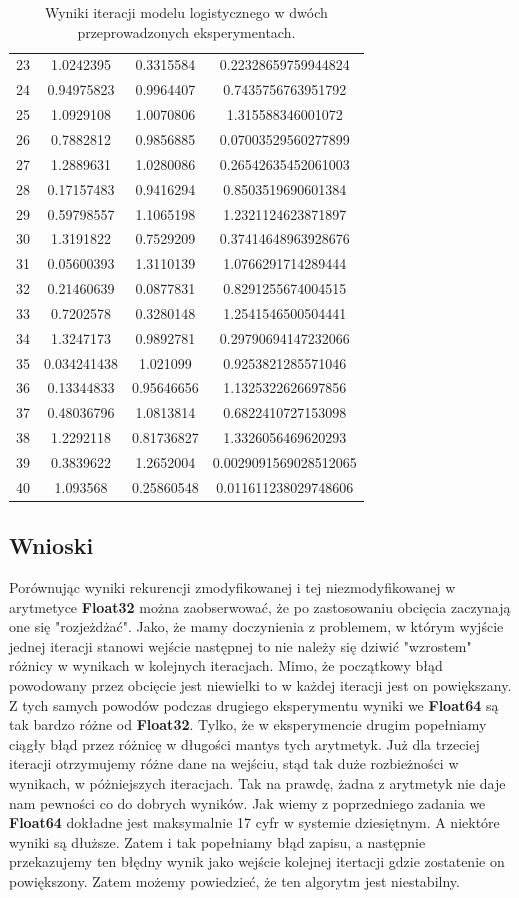 \documentclass[]{article}
\begin{document}
\begin{table}[h!]
\begin{tabular}{||c c c c||}
		23 & 1.0242395 & 0.3315584 & 0.22328659759944824 \\
		24 & 0.94975823 & 0.9964407 & 0.7435756763951792 \\
		25 & 1.0929108 & 1.0070806 & 1.315588346001072 \\
		26 & 0.7882812 & 0.9856885 & 0.07003529560277899 \\
		27 & 1.2889631 & 1.0280086 & 0.26542635452061003 \\
		28 & 0.17157483 & 0.9416294 & 0.8503519690601384 \\
		29 & 0.59798557 & 1.1065198 & 1.2321124623871897 \\
		30 & 1.3191822 & 0.7529209 & 0.37414648963928676 \\
		31 & 0.05600393 & 1.3110139 & 1.0766291714289444 \\
		32 & 0.21460639 & 0.0877831 & 0.8291255674004515 \\
		33 & 0.7202578 & 0.3280148 & 1.2541546500504441 \\
		34 & 1.3247173 & 0.9892781 & 0.29790694147232066 \\
		35 & 0.034241438 & 1.021099 & 0.9253821285571046 \\
		36 & 0.13344833 & 0.95646656 & 1.1325322626697856 \\
		37 & 0.48036796 & 1.0813814 & 0.6822410727153098 \\
		38 & 1.2292118 & 0.81736827 & 1.3326056469620293 \\
		39 & 0.3839622 & 1.2652004 & 0.0029091569028512065 \\
		40 & 1.093568 & 0.25860548 & 0.011611238029748606 \\
		\hline
	\end{tabular}
	\caption{Wyniki iteracji modelu logistycznego w dwóch przeprowadzonych eksperymentach.}
\end{table}
\subsection{Wnioski}
Porównując wyniki rekurencji zmodyfikowanej i tej niezmodyfikowanej w arytmetyce \textbf{Float32} można zaobserwować, że po zastosowaniu obcięcia zaczynają one się "rozjeżdżać". Jako, że mamy doczynienia z problemem, w którym wyjście jednej iteracji stanowi wejście następnej to nie należy się dziwić "wzrostem" różnicy w wynikach w kolejnych iteracjach. Mimo, że początkowy błąd powodowany przez obcięcie jest niewielki to w każdej iteracji jest on powiększany. Z tych samych powodów podczas drugiego eksperymentu wyniki we \textbf{Float64} są tak bardzo różne od \textbf{Float32}. Tylko, że w eksperymencie drugim popełniamy ciągły błąd przez różnicę w długości mantys tych arytmetyk. Już dla trzeciej iteracji otrzymujemy różne dane na wejściu, stąd tak duże rozbieżności w wynikach, w póżniejszych iteracjach. Tak na prawdę, żadna z arytmetyk nie daje nam pewności co do dobrych wyników. Jak wiemy z poprzedniego zadania we \textbf{Float64} dokładne jest maksymalnie 17 cyfr w systemie dziesiętnym. A niektóre wyniki są dłuższe. Zatem i tak popełniamy błąd zapisu, a następnie przekazujemy ten błędny wynik jako wejście kolejnej itertacji gdzie zostatenie on powiększony. Zatem możemy powiedzieć, że ten algorytm jest niestabilny.     
\end{document}
